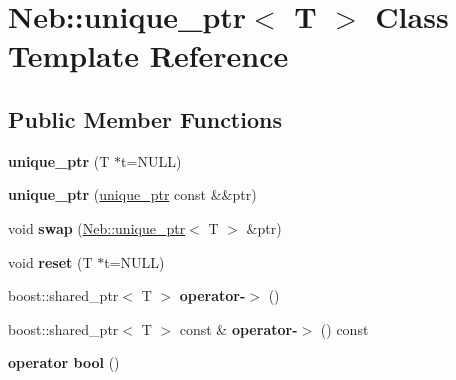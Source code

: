 \hypertarget{classNeb_1_1unique__ptr}{\section{\-Neb\-:\-:unique\-\_\-ptr$<$ \-T $>$ \-Class \-Template \-Reference}
\label{classNeb_1_1unique__ptr}
}
\subsection*{\-Public \-Member \-Functions}
\begin{DoxyCompactItemize}
\item 
\hypertarget{classNeb_1_1unique__ptr_ab549dc5789b1ec0786538fd93a1378cb}{{\bfseries unique\-\_\-ptr} (\-T $\ast$t=\-N\-U\-L\-L)}\label{classNeb_1_1unique__ptr_ab549dc5789b1ec0786538fd93a1378cb}

\item 
\hypertarget{classNeb_1_1unique__ptr_afa78e9899c9c748b5f269cd3b3ecb8fd}{{\bfseries unique\-\_\-ptr} (\hyperlink{classNeb_1_1unique__ptr}{unique\-\_\-ptr} const \&\&ptr)}\label{classNeb_1_1unique__ptr_afa78e9899c9c748b5f269cd3b3ecb8fd}

\item 
\hypertarget{classNeb_1_1unique__ptr_a3c9f699604852a570044b19a6984f096}{void {\bfseries swap} (\hyperlink{classNeb_1_1unique__ptr}{\-Neb\-::unique\-\_\-ptr}$<$ \-T $>$ \&ptr)}\label{classNeb_1_1unique__ptr_a3c9f699604852a570044b19a6984f096}

\item 
\hypertarget{classNeb_1_1unique__ptr_ae0e196e2210b06cd645da9030a51503a}{void {\bfseries reset} (\-T $\ast$t=\-N\-U\-L\-L)}\label{classNeb_1_1unique__ptr_ae0e196e2210b06cd645da9030a51503a}

\item 
\hypertarget{classNeb_1_1unique__ptr_aa488bf338cd935decccc66e2b9c96d0b}{boost\-::shared\-\_\-ptr$<$ \-T $>$ {\bfseries operator-\/$>$} ()}\label{classNeb_1_1unique__ptr_aa488bf338cd935decccc66e2b9c96d0b}

\item 
\hypertarget{classNeb_1_1unique__ptr_a4ca75f1d46551e5ae268e94bdc242cf2}{boost\-::shared\-\_\-ptr$<$ \-T $>$ const \& {\bfseries operator-\/$>$} () const }\label{classNeb_1_1unique__ptr_a4ca75f1d46551e5ae268e94bdc242cf2}

\item 
\hypertarget{classNeb_1_1unique__ptr_a299f10b1de2b1c37d3795753eecdf632}{{\bfseries operator bool} ()}\label{classNeb_1_1unique__ptr_a299f10b1de2b1c37d3795753eecdf632}


\end{DoxyCompactItemize}
